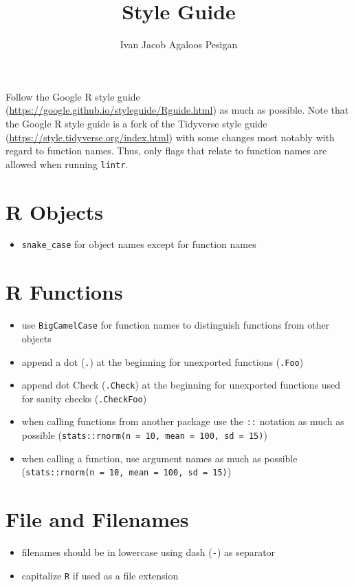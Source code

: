 \documentclass{article}
\title{Style Guide}
\author{Ivan Jacob Agaloos Pesigan}
\date{}
\begin{document}
\maketitle

Follow the Google R style guide (\url{https://google.github.io/styleguide/Rguide.html}) as much as possible.
Note that the Google R style guide is a fork of the Tidyverse style guide (\url{https://style.tidyverse.org/index.html})
with some changes most notably with regard to function names.
Thus, only flags that relate to function names
are allowed when running \texttt{lintr}.

\section{R Objects}

\begin{itemize}
    \item \texttt{snake\_case} for object names except for function names
\end{itemize}

\section{R Functions}

\begin{itemize}
    \item use \texttt{BigCamelCase} for function names to distinguish functions from other objects 
    \item append a dot (\texttt{.}) at the beginning for unexported functions (\texttt{.Foo})
    \item append dot Check (\texttt{.Check}) at the beginning for unexported functions used for sanity checks (\texttt{.CheckFoo})
    \item when calling functions from another package use the \texttt{::} notation as much as possible (\texttt{stats::rnorm(n = 10, mean = 100, sd = 15)})
    \item when calling a function, use argument names as much as possible (\texttt{stats::rnorm(n = 10, mean = 100, sd = 15)})
\end{itemize}

\section{File and Filenames}

\begin{itemize}
    \item filenames should be in lowercase using dash (\texttt{-}) as separator
    \item capitalize \texttt{R} if used as a file extension
\end{itemize}
\end{document}
